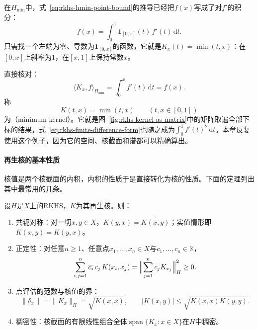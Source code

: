 在$H_{\min}$中，式~\eqref{eq:rkhs-hmin-point-bound}的推导已经把$f(x)$写成了对$f'$的积分：
\[
f(x)=\int_0^1\mathbf 1_{[0,x]}(t)\,f'(t)\,\mathrm dt .
\]
只需找一个左端为零、导数为$\mathbf 1_{[0,x]}$的函数，它就是$K_x(t)=\min(t,x)$：在$[0,x]$上斜率为$1$，在$[x,1]$上保持常数$x$。

直接核对：
\[
\langle K_x,f\rangle_{H_{\min}}=\int_0^xf'(t)\,\mathrm dt=f(x) .
\]
称
\[
K(t,x)=\min(t,x)\qquad(t,x\in[0,1])
\]
为（minimum kernel）。它就是图~\ref{fig:rkhs-kernel-as-matrix}中的矩阵取遍全部下标的结果，式~\eqref{eq:rkhs-finite-difference-form}也随之成为$\int_0^1f'(t)^2\,\mathrm dt$。本章反复使用这个例子，因为它的空间、核截面和谱都可以精确算出。

\paragraph{再生核的基本性质}

核值是两个核截面的内积，内积的性质于是直接转化为核的性质。下面的定理列出其中最常用的几条。

\begin{theorem}[再生核的基本性质]
\label{thm:rkhs-kernel-properties}
设$H$是$X$上的RKHS，$K$为其再生核。则：
\begin{enumerate}
\item 共轭对称：对一切$x,y\in X$，$K(y,x)=\overline{K(x,y)}$；实值情形即$K(x,y)=K(y,x)$。
\item 正定性：对任意$n\geq1$、任意点$x_1,\ldots,x_n\in X$与$c_1,\ldots,c_n\in\mathbb K$，
\begin{equation}
\sum_{i,j=1}^n\overline{c_i}\,c_j\,K(x_i,x_j)=\Bigl\lVert\sum_{j=1}^nc_jK_{x_j}\Bigr\rVert_H^2\geq0 .
\label{eq:rkhs-kernel-positivity}
\end{equation}
\item 点评估的范数与核值的界：
\begin{equation}
\lVert\delta_x\rVert=\lVert K_x\rVert_H=\sqrt{K(x,x)},\qquad
\lvert K(x,y)\rvert\leq\sqrt{K(x,x)K(y,y)} .
\label{eq:rkhs-kernel-norm}
\end{equation}
\item 稠密性：核截面的有限线性组合全体$\operatorname{span}\{K_x:x\in X\}$在$H$中稠密。
\end{enumerate}
\end{theorem}

